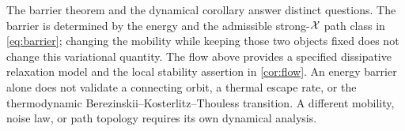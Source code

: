The barrier theorem and the dynamical corollary answer distinct questions.
The barrier is determined by the energy and the admissible strong-$\mathcal X$
path class in \eqref{eq:barrier}; changing the mobility while keeping
those two objects fixed does not change this variational quantity.
The flow above provides a specified dissipative relaxation model and
the local stability assertion in \cref{cor:flow}. An energy barrier alone
does not validate a connecting orbit, a thermal escape rate, or the
thermodynamic Berezinskii--Kosterlitz--Thouless transition. A different
mobility, noise law, or path topology requires its own dynamical analysis.
